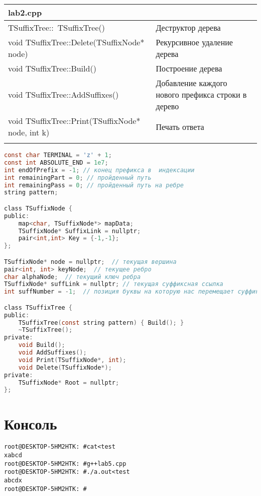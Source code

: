 \begin{longtable}{|p{7.5cm}|p{7.5cm}|}
\hline
\rowcolor{lightgray}
\multicolumn{2}{|c|} {lab2.cpp}\\
\hline
TSuffixTree::~TSuffixTree()& Деструктор дерева\\
\hline
void TSuffixTree::Delete(TSuffixNode* node)& Рекурсивное удаление дерева\\
\hline
void TSuffixTree::Build() & Построение дерева\\
\hline
void TSuffixTree::AddSuffixes()& Добавление каждого нового префикса строки в дерево\\
\hline
void TSuffixTree::Print(TSuffixNode* node, int k)& Печать ответа\\
\hline
\rowcolor{lightgray}
\hline
\end{longtable}

\begin{lstlisting}[language=C]
const char TERMINAL = 'z' + 1;
const int ABSOLUTE_END = 1e7;
int endOfPrefix = -1; // конец префикса в  индексации
int remainingPart = 0; // пройденный путь
int remainingPass = 0; // пройденный путь на ребре
string pattern; 

class TSuffixNode {
public:
    map<char, TSuffixNode*> mapData;
    TSuffixNode* SuffixLink = nullptr;
    pair<int,int> Key = {-1,-1};
};

TSuffixNode* node = nullptr;  // текущая вершина
pair<int, int> keyNode;  // текущее ребро
char alphaNode;  // текущий ключ ребра
TSuffixNode* suffLink = nullptr; // текущая суффиксная ссылка
int suffNumber = -1;  // позиция буквы на которую нас перемещает суффиксная ссылка

class TSuffixTree {
public:
    TSuffixTree(const string pattern) { Build(); }
    ~TSuffixTree();
private:
    void Build();
    void AddSuffixes();
    void Print(TSuffixNode*, int);
    void Delete(TSuffixNode*);
private:
    TSuffixNode* Root = nullptr;
};
\end{lstlisting}


\section{Консоль}
\begin{alltt}
root@DESKTOP-5HM2HTK:~# cat <test
xabcd
root@DESKTOP-5HM2HTK:~# g++ lab5.cpp
root@DESKTOP-5HM2HTK:~# ./a.out <test
abcdx
root@DESKTOP-5HM2HTK:~#
\end{alltt}
\pagebreak

